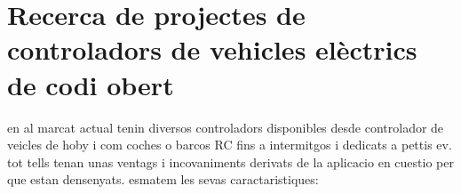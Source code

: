 









\section{Recerca de projectes de controladors de vehicles elèctrics de codi obert}


en al marcat actual tenin diversos controladors disponibles desde controlador de veicles de hoby i com coches o barcos RC fins a intermitgos i dedicats a pettis ev. tot tells tenan unas ventags i incovaniments derivats de la aplicacio en cuestio per que estan densenyats. esmatem les sevas caractaristiques: \bigskip

